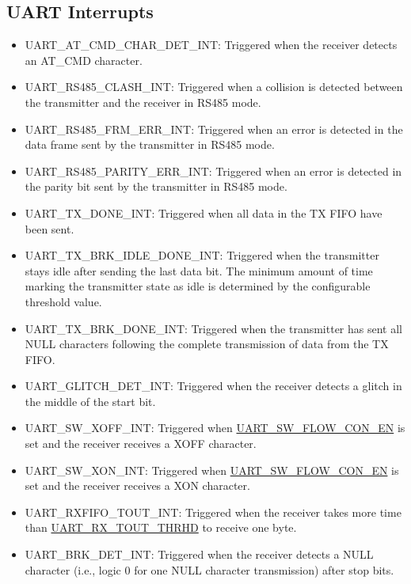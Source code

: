 \documentclass[main\_\_EN.tex]{subfiles}
\begin{document}
\subsection{UART Interrupts}
\begin{itemize}
\item \label{int:UARTATCMDCHARDETINT}UART\_AT\_CMD\_CHAR\_DET\_INT: Triggered when the receiver detects an AT\_CMD character.
\item \label{int:UARTRS485CLASHINT}UART\_RS485\_CLASH\_INT: Triggered when a collision is detected between the transmitter and the receiver in RS485 mode.
\item \label{int:UARTRS485FRMERRINT}UART\_RS485\_FRM\_ERR\_INT: Triggered when an error is detected in the data frame sent by the transmitter in RS485 mode.
\item \label{int:UARTRS485PARITYERRINT}UART\_RS485\_PARITY\_ERR\_INT: Triggered when an error is detected in the parity bit sent by the transmitter in RS485 mode.
\item \label{int:UARTTXDONEINT}UART\_TX\_DONE\_INT: Triggered when all data in the TX FIFO have been sent.
\item \label{int:UARTTXBRKIDLEDONEINT}UART\_TX\_BRK\_IDLE\_DONE\_INT: Triggered when the transmitter stays idle after sending the last data bit. The minimum amount of time marking the transmitter state as idle is determined by the configurable threshold value.
\item \label{int:UARTTXBRKDONEINT}UART\_TX\_BRK\_DONE\_INT: Triggered when the transmitter has sent all NULL characters following the complete transmission of data from the TX FIFO.
\item \label{int:UARTGLITCHDETINT}UART\_GLITCH\_DET\_INT: Triggered when the receiver detects a glitch in the middle of the start bit.
\item \label{int:UARTSWXOFFINT}UART\_SW\_XOFF\_INT: Triggered when \hyperref[fielddesc:UARTSWFLOWCONEN]{UART\_SW\_FLOW\_CON\_EN} is set and the receiver receives a XOFF character.
\item \label{int:UARTSWXONINT}UART\_SW\_XON\_INT: Triggered when \hyperref[fielddesc:UARTSWFLOWCONEN]{UART\_SW\_FLOW\_CON\_EN} is set and the receiver receives a XON character.
\item \label{int:UARTRXFIFOTOUTINT}UART\_RXFIFO\_TOUT\_INT: Triggered when the receiver takes more time than \hyperref[fielddesc:UARTRXTOUTTHRHD]{UART\_RX\_TOUT\_THRHD} to receive one byte.
\item \label{int:UARTBRKDETINT}UART\_BRK\_DET\_INT: Triggered when the receiver detects a NULL character (i.e., logic 0 for one NULL character transmission) after stop bits.

\end{itemize}
\end{document}
